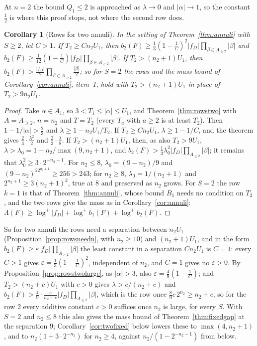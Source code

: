 \documentclass[11pt]{article}
\newtheorem{corollary}[theorem]{Corollary}
\begin{document}
At $n=2$ the bound $Q_1\le2$ is approached as $\lambda\to0$ and
$|\alpha|\to1$, so the constant $\frac12$ is where this proof stops, not
where the second row does.

\begin{corollary}[Rows for two annuli]\label{cor:rowstwo}
In the setting of Theorem~\ref{thm:annuli} with $S\ge2$, let $C>1$.  If
$T_2\ge Cn_2U_1$, then $b_2(F)\ge\frac13(1-\frac1C)^2|f_D|\prod_{\beta\in A_{\ge2}}|\beta|$
and $b_2(F)\ge\frac1{12}(1-\frac1C)|f_D|\prod_{\beta\in A_{\ge2}}|\beta|$.  If
$T_2>(n_2+1)U_1$, then
$b_2(F)>\frac{|f_D|}2\prod_{\beta\in A_{\ge2}}\frac{|\beta|}2$; so for $S=2$
the rows and the mass bound of Corollary~\ref{cor:annuli}, item~1, hold with
$T_2>(n_2+1)U_1$ in place of $T_2>9n_2U_1$.
\end{corollary}

\begin{proof}
Take $\alpha\in A_1$, so $3<T_1\le|\alpha|\le U_1$, and
Theorem~\ref{thm:rowstwo} with $A=A_{\ge2}$, $n=n_2$ and $T=T_2$ (every $T_a$
with $a\ge2$ is at least $T_2$).  Then $1-1/|\alpha|>\frac23$ and
$\lambda\ge1-n_2U_1/T_2$.  If $T_2\ge Cn_2U_1$, $\lambda\ge1-1/C$, and
the theorem gives $\frac23\cdot\frac{\lambda^2}2$ and $\frac23\cdot\frac\lambda8$.  If
$T_2>(n_2+1)U_1$, then, as also $T_2>9U_1$, $\lambda>\lambda_0=1-n_2/\max(9,n_2+1)$,
and $b_2(F)>\frac13\lambda_0^2|f_D|\prod_{A_{\ge2}}|\beta|$; it remains that
$\lambda_0^2\ge3\cdot2^{-n_2-1}$.  For $n_2\le8$, $\lambda_0=(9-n_2)/9$ and
$(9-n_2)^22^{n_2+1}\ge256>243$; for $n_2\ge8$, $\lambda_0=1/(n_2+1)$ and
$2^{n_2+1}\ge3(n_2+1)^2$, true at $8$ and preserved as $n_2$ grows.  For
$S=2$ the row $k=1$ is that of Theorem~\ref{thm:annuli}, whose bound $B_1$
needs no condition on $T_2$, and the two rows give the mass as in
Corollary~\ref{cor:annuli}: $\Lambda(F)\ge\log^+|f_D|+\log^+b_1(F)+\log^+b_2(F)$.
\end{proof}

So for two annuli the rows need a separation between $n_2U_1$
(Proposition~\ref{prop:rowsneedn}, with $n_2\ge10$) and $(n_2+1)U_1$, and
in the form $b_2(F)\ge\varepsilon|f_D|\prod_{A_{\ge2}}|\beta|$ the least
constant in a separation $Cn_2U_1$ is $C=1$: every $C>1$ gives
$\varepsilon=\frac13(1-\frac1C)^2$, independent of $n_2$, and $C=1$ gives no
$\varepsilon>0$.  By Proposition~\ref{prop:rowstwolarge}, as $|\alpha|>3$,
also $\varepsilon=\frac49(1-\frac1C)$; and $T_2>(n_2+c)U_1$ with $c>0$ gives
$\lambda>c/(n_2+c)$ and
$b_2(F)>\frac49\cdot\frac c{n_2+c}|f_D|\prod_{A_{\ge2}}|\beta|$, which is the row
once $\frac89c\,2^{n_2}\ge n_2+c$, so for the row $2$ every additive
constant $c>0$ suffices once $n_2$ is large, for every $S$.  With $S=2$ and $n_2\le8$ this also gives the mass bound of
Theorem~\ref{thm:fixedgap} at the separation $9$; Corollary~\ref{cor:twofixed}
below lowers these to $\max(4,n_2+1)$, and to $n_2(1+3\cdot2^{-n_2})$ for
$n_2\ge4$, against $n_2/(1-2^{-n_2-1})$ from below.
\end{document}

